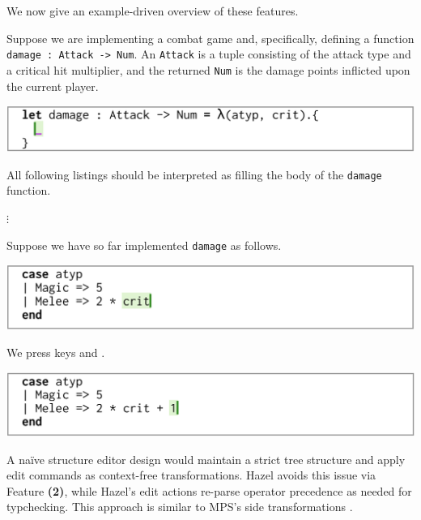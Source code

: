 \documentclass[format=sigplan,dvipsnames,backend=bibtex]{acmart}
\newcommand{\Hazel}{\textsf{Hazel}\xspace}
\newcommand{\key}[1]{\fbox{\texttt{#1}}}
\begin{document}
\newcommand{\feat}[1]{{\bfseries (#1)}}

We now give an example-driven overview of these features.


Suppose we are implementing a combat game and, specifically, defining a function
	\texttt{damage : Attack -> Num}. An \texttt{Attack} is a tuple consisting of the
	attack type and a critical hit multiplier, and the returned \texttt{Num} is the
	damage points inflicted upon the current player.
	
{\centering
  \includegraphics[width=\linewidth]{fig/context.png}\par
}
\noindent
All following listings should be interpreted as filling the body of the \texttt{damage} function.

{\centering
	\vspace{-0.1cm}
  $\vdots$\par
  \vspace{0.1cm}
}
\noindent
Suppose we have so far implemented \texttt{damage} as follows.

{\centering
  \includegraphics[width=\linewidth]{fig/frame1.png}\par
}
\noindent
We press keys \key{+} and \key{1}.

{\centering
  \includegraphics[width=\linewidth]{fig/frame2.png}\par
}
\noindent
A naïve structure editor design would maintain a strict tree structure and apply
	edit commands as context-free transformations. \Hazel avoids this issue via
	Feature \feat{2}, while \Hazel's edit actions re-parse operator precedence as
	needed for typchecking. This approach is similar to MPS's side transformations \cite{GrammarCells}.
\end{document}
